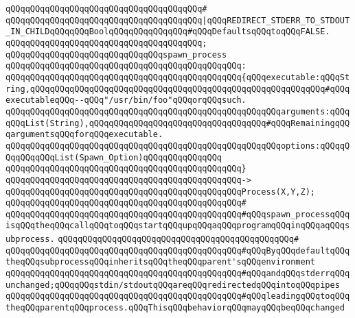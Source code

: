\verb|qQQqqQQqqQQqqQQqqQQqqQQqqQQqqQQqqQQqqQQq#|\newline
\verb|qQQqqQQqqQQqqQQqqQQqqQQqqQQqqQQqqQQqqQQq|\verb#|qQQqREDIRECT_STDERR_TO_STDOUT_IN_CHILDqQQqqQQqBoolqQQqqQQqqQQqqQQq#\verb|#qQQqDefaultsqQQqtoqQQqFALSE.|\newline
\verb|qQQqqQQqqQQqqQQqqQQqqQQqqQQqqQQqqQQqqQQq;|\newline
\newline
\verb|qQQqqQQqqQQqqQQqqQQqqQQqqQQqqQQqspawn_process|\newline
\verb|qQQqqQQqqQQqqQQqqQQqqQQqqQQqqQQqqQQqqQQqqQQqqQQq:|\newline
\verb|qQQqqQQqqQQqqQQqqQQqqQQqqQQqqQQqqQQqqQQqqQQqqQQq{qQQqexecutable:qQQqString,qQQqqQQqqQQqqQQqqQQqqQQqqQQqqQQqqQQqqQQqqQQqqQQqqQQqqQQqqQQq#qQQqexecutableqQQq--qQQq"/usr/bin/foo"qQQqorqQQqsuch.|\newline
\verb|qQQqqQQqqQQqqQQqqQQqqQQqqQQqqQQqqQQqqQQqqQQqqQQqqQQqqQQqarguments:qQQqqQQqList(String),qQQqqQQqqQQqqQQqqQQqqQQqqQQqqQQqqQQq#qQQqRemainingqQQqargumentsqQQqforqQQqexecutable.|\newline
\verb|qQQqqQQqqQQqqQQqqQQqqQQqqQQqqQQqqQQqqQQqqQQqqQQqqQQqqQQqoptions:qQQqqQQqqQQqqQQqList(Spawn_Option)qQQqqQQqqQQqqQQq|\newline
\verb|qQQqqQQqqQQqqQQqqQQqqQQqqQQqqQQqqQQqqQQqqQQqqQQq}|\newline
\verb|qQQqqQQqqQQqqQQqqQQqqQQqqQQqqQQqqQQqqQQqqQQqqQQq->|\newline
\verb|qQQqqQQqqQQqqQQqqQQqqQQqqQQqqQQqqQQqqQQqqQQqqQQqProcess(X,Y,Z);|\newline
\verb|qQQqqQQqqQQqqQQqqQQqqQQqqQQqqQQqqQQqqQQqqQQqqQQq#|\newline
\verb|qQQqqQQqqQQqqQQqqQQqqQQqqQQqqQQqqQQqqQQqqQQqqQQq#qQQqspawn_processqQQqisqQQqtheqQQqcallqQQqtoqQQqstartqQQqupqQQqaqQQqprogramqQQqinqQQqaqQQqsubprocess.|\newline
\verb|qQQqqQQqqQQqqQQqqQQqqQQqqQQqqQQqqQQqqQQqqQQqqQQq#|\newline
\verb|qQQqqQQqqQQqqQQqqQQqqQQqqQQqqQQqqQQqqQQqqQQqqQQq#qQQqByqQQqdefaultqQQqtheqQQqsubprocessqQQqinheritsqQQqtheqQQqparent'sqQQqenvironment|\newline
\verb|qQQqqQQqqQQqqQQqqQQqqQQqqQQqqQQqqQQqqQQqqQQqqQQq#qQQqandqQQqstderrqQQqunchanged;qQQqqQQqstdin/stdoutqQQqareqQQqredirectedqQQqintoqQQqpipes|\newline
\verb|qQQqqQQqqQQqqQQqqQQqqQQqqQQqqQQqqQQqqQQqqQQqqQQq#qQQqleadingqQQqtoqQQqtheqQQqparentqQQqprocess.qQQqThisqQQqbehaviorqQQqmayqQQqbeqQQqchanged|\newline
